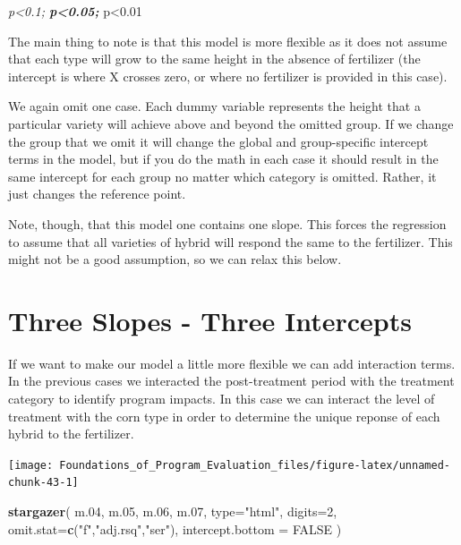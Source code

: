 \documentclass[]{book}
\newenvironment{Shaded}{\begin{snugshade}}{\end{snugshade}}
\newcommand{\DataTypeTok}[1]{\textcolor[rgb]{0.13,0.29,0.53}{#1}}
\newcommand{\DecValTok}[1]{\textcolor[rgb]{0.00,0.00,0.81}{#1}}
\newcommand{\FloatTok}[1]{\textcolor[rgb]{0.00,0.00,0.81}{#1}}
\newcommand{\KeywordTok}[1]{\textcolor[rgb]{0.13,0.29,0.53}{\textbf{#1}}}
\newcommand{\NormalTok}[1]{#1}
\newcommand{\OtherTok}[1]{\textcolor[rgb]{0.56,0.35,0.01}{#1}}
\newcommand{\StringTok}[1]{\textcolor[rgb]{0.31,0.60,0.02}{#1}}
\theoremstyle{definition}
\theoremstyle{definition}
\theoremstyle{definition}
\theoremstyle{remark}
\begin{document}
\emph{p\textless{}0.1; \textbf{p\textless{}0.05; }}p\textless{}0.01

The main thing to note is that this model is more flexible as it does
not assume that each type will grow to the same height in the absence of
fertilizer (the intercept is where X crosses zero, or where no
fertilizer is provided in this case).

We again omit one case. Each dummy variable represents the height that a
particular variety will achieve above and beyond the omitted group. If
we change the group that we omit it will change the global and
group-specific intercept terms in the model, but if you do the math in
each case it should result in the same intercept for each group no
matter which category is omitted. Rather, it just changes the reference
point.

Note, though, that this model one contains one slope. This forces the
regression to assume that all varieties of hybrid will respond the same
to the fertilizer. This might not be a good assumption, so we can relax
this below.

\hypertarget{three-slopes---three-intercepts}{%
\section{Three Slopes - Three
Intercepts}\label{three-slopes---three-intercepts}}

If we want to make our model a little more flexible we can add
interaction terms. In the previous cases we interacted the
post-treatment period with the treatment category to identify program
impacts. In this case we can interact the level of treatment with the
corn type in order to determine the unique reponse of each hybrid to the
fertilizer.

\begin{center}\texttt{[image: Foundations\_of\_Program\_Evaluation\_files/figure-latex/unnamed-chunk-43-1]} \end{center}

\begin{Shaded}
\begin{Highlighting}[]

\KeywordTok{stargazer}\NormalTok{( m}\FloatTok{.04}\NormalTok{, m}\FloatTok{.05}\NormalTok{, m}\FloatTok{.06}\NormalTok{, m}\FloatTok{.07}\NormalTok{, }\DataTypeTok{type=}\StringTok{"html"}\NormalTok{, }
           \DataTypeTok{digits=}\DecValTok{2}\NormalTok{, }
           \DataTypeTok{omit.stat=}\KeywordTok{c}\NormalTok{(}\StringTok{"f"}\NormalTok{,}\StringTok{"adj.rsq"}\NormalTok{,}\StringTok{"ser"}\NormalTok{),}
           \DataTypeTok{intercept.bottom =} \OtherTok{FALSE}\NormalTok{ )        }
\end{Highlighting}
\end{Shaded}
\end{document}
